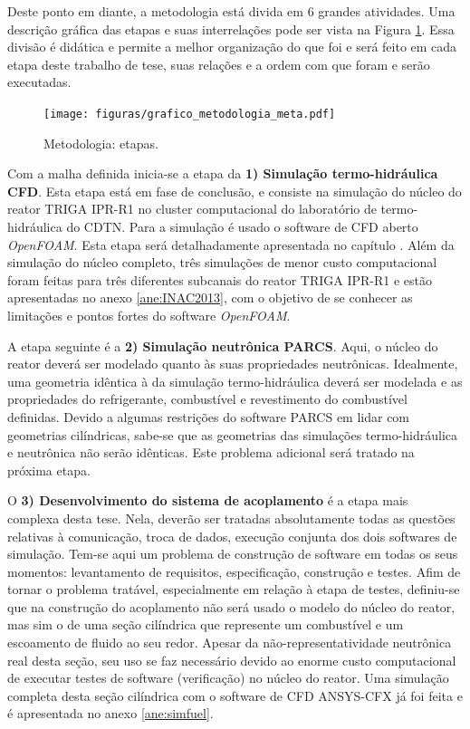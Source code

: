 \documentclass[12pt,openright,twoside,a4paper,english,french,spanish,brazil]{abntex2}
\begin{document}
Deste ponto em diante, a metodologia está divida em 6 grandes atividades. Uma descrição gráfica 
das etapas e suas interrelações pode ser vista na Figura \ref{metodetapas}. Essa divisão é didática 
e permite a melhor organização do que foi e será feito em cada etapa deste trabalho de tese, suas 
relações e a ordem com que foram e serão executadas.

\begin{figure}[h]
  \centering\texttt{[image: figuras/grafico\_metodologia\_meta.pdf]}
  \caption{Metodologia: etapas.}
  \label{metodetapas}
\end{figure}

Com a malha definida inicia-se a etapa da \textbf{1) Simulação termo-hidráulica CFD}. Esta etapa 
está em fase de conclusão, e consiste na simulação do núcleo do reator TRIGA IPR-R1 no cluster computacional 
do laboratório de termo-hidráulica do CDTN. Para a simulação é usado o software de CFD aberto \textit{OpenFOAM}. 
Esta etapa será detalhadamente apresentada no capítulo . Além da simulação do núcleo 
completo, três simulações de menor custo computacional foram feitas para três diferentes subcanais do reator 
TRIGA IPR-R1 e estão apresentadas no anexo \ref{ane:INAC2013}, com o objetivo de se conhecer as 
limitações e pontos fortes do software \textit{OpenFOAM}.

A etapa seguinte é a \textbf{2) Simulação neutrônica PARCS}. Aqui, o núcleo do reator deverá ser modelado quanto 
às suas propriedades neutrônicas. Idealmente, uma geometria idêntica à da simulação termo-hidráulica deverá ser 
modelada e as propriedades do refrigerante, combustível e revestimento do combustível definidas. Devido a 
algumas restrições do software PARCS em lidar com geometrias cilíndricas, sabe-se que as geometrias das simulações 
termo-hidráulica e neutrônica não serão idênticas. Este problema adicional será tratado na próxima etapa.

O \textbf{3) Desenvolvimento do sistema de acoplamento} é a etapa mais complexa desta tese. Nela, deverão 
ser tratadas absolutamente todas as questões relativas à comunicação, troca de dados, execução conjunta dos 
dois softwares de simulação. Tem-se aqui um problema de construção de software em todas os seus momentos: 
levantamento de requisitos, especificação, construção e testes. Afim de tornar o problema tratável, especialmente 
em relação à etapa de testes, definiu-se que na construção do acoplamento não será usado o modelo do núcleo do 
reator, mas sim o de uma seção cilíndrica que represente um combustível e um escoamento de fluido ao seu redor.
Apesar da não-representatividade neutrônica real desta seção, seu uso se faz necessário devido ao enorme custo 
computacional de executar testes de software (verificação) no núcleo do reator. Uma simulação completa desta seção 
cilíndrica com o software de CFD ANSYS-CFX já foi feita e é apresentada no anexo \ref{ane:simfuel}.
\end{document}
